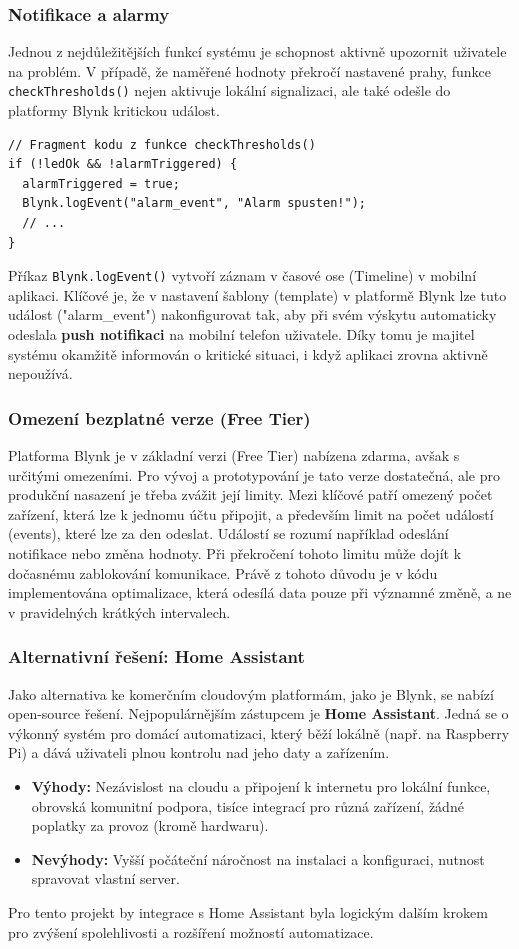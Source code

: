 \documentclass[12pt, twoside]{article} %
\begin{document}
\subsubsection{Notifikace a alarmy}
Jednou z nejdůležitějších funkcí systému je schopnost aktivně upozornit uživatele na problém. V případě, že naměřené hodnoty překročí nastavené prahy, funkce \texttt{checkThresholds()} nejen aktivuje lokální signalizaci, ale také odešle do platformy Blynk kritickou událost.
\begin{lstlisting}
// Fragment kodu z funkce checkThresholds()
if (!ledOk && !alarmTriggered) {
  alarmTriggered = true;
  Blynk.logEvent("alarm_event", "Alarm spusten!");
  // ...
}
\end{lstlisting}
Příkaz \texttt{Blynk.logEvent()} vytvoří záznam v časové ose (Timeline) v mobilní aplikaci. Klíčové je, že v nastavení šablony (template) v platformě Blynk lze tuto událost ("alarm\_event") nakonfigurovat tak, aby při svém výskytu automaticky odeslala \textbf{push notifikaci} na mobilní telefon uživatele. Díky tomu je majitel systému okamžitě informován o kritické situaci, i když aplikaci zrovna aktivně nepoužívá.

\subsubsection{Omezení bezplatné verze (Free Tier)}
Platforma Blynk je v základní verzi (Free Tier) nabízena zdarma, avšak s určitými omezeními. Pro vývoj a prototypování je tato verze dostatečná, ale pro produkční nasazení je třeba zvážit její limity. Mezi klíčové patří omezený počet zařízení, která lze k jednomu účtu připojit, a především limit na počet událostí (events), které lze za den odeslat. Událostí se rozumí například odeslání notifikace nebo změna hodnoty. Při překročení tohoto limitu může dojít k dočasnému zablokování komunikace. Právě z tohoto důvodu je v kódu implementována optimalizace, která odesílá data pouze při významné změně, a ne v pravidelných krátkých intervalech.

\subsubsection{Alternativní řešení: Home Assistant}
Jako alternativa ke komerčním cloudovým platformám, jako je Blynk, se nabízí open-source řešení. Nejpopulárnějším zástupcem je \textbf{Home Assistant}. Jedná se o výkonný systém pro domácí automatizaci, který běží lokálně (např. na Raspberry Pi) a dává uživateli plnou kontrolu nad jeho daty a zařízením.
\begin{itemize}
    \item \textbf{Výhody:} Nezávislost na cloudu a připojení k internetu pro lokální funkce, obrovská komunitní podpora, tisíce integrací pro různá zařízení, žádné poplatky za provoz (kromě hardwaru).
    \item \textbf{Nevýhody:} Vyšší počáteční náročnost na instalaci a konfiguraci, nutnost spravovat vlastní server.
\end{itemize}
Pro tento projekt by integrace s Home Assistant byla logickým dalším krokem pro zvýšení spolehlivosti a rozšíření možností automatizace.
\end{document}
